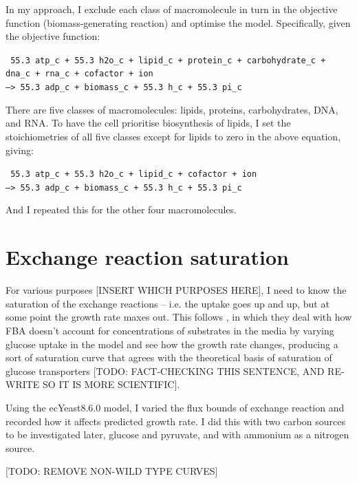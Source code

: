 In my approach, I exclude each class of macromolecule in turn in the objective function (biomass-generating reaction) and optimise the model.
Specifically, given the objective function:

\texttt{
  55.3 atp\_c + 55.3 h2o\_c + lipid\_c + protein\_c + carbohydrate\_c + dna\_c + rna\_c + cofactor + ion \\
  --> 55.3 adp\_c + biomass\_c + 55.3 h\_c + 55.3 pi\_c
}

There are five classes of macromolecules: lipids, proteins, carbohydrates, DNA, and RNA.
To have the cell prioritise biosynthesis of lipids, I set the stoichiometries of all five classes except for lipids to zero in the above equation, giving:

\texttt{
  55.3 atp\_c + 55.3 h2o\_c + lipid\_c + cofactor + ion \\
  --> 55.3 adp\_c + biomass\_c + 55.3 h\_c + 55.3 pi\_c
}

And I repeated this for the other four macromolecules.

\section{Exchange reaction saturation}
\label{sec:model-saturation}

For various purposes [INSERT WHICH PURPOSES HERE], I need to know the saturation of the exchange reactions -- i.e. the uptake goes up and up, but at some point the growth rate maxes out.
This follows \textcite{elsemmanWholecellModelingYeast2022}, in which they deal with how FBA doesn't account for concentrations of substrates in the media by varying glucose uptake in the model and see how the growth rate changes, producing a sort of saturation curve that agrees with the theoretical basis of saturation of glucose transporters [TODO: FACT-CHECKING THIS SENTENCE, AND RE-WRITE SO IT IS MORE SCIENTIFIC].

Using the ecYeast8.6.0 model, I varied the flux bounds of exchange reaction and recorded how it affects predicted growth rate.
I did this with two carbon sources to be investigated later, glucose and pyruvate, and with ammonium as a nitrogen source.

[TODO: REMOVE NON-WILD TYPE CURVES]

